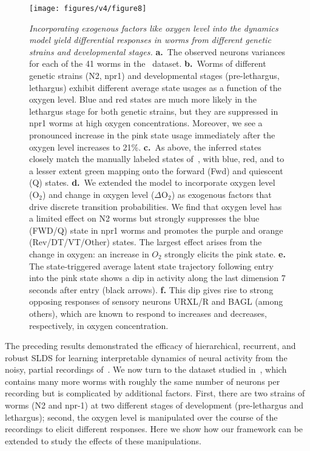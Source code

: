\documentclass[11pt]{article}
\begin{document}
\begin{figure}[t!]
\centering
\texttt{[image: figures/v4/figure8]} 
\caption{\textit{Incorporating exogenous factors like oxygen level
    into the dynamics model yield differential responses in worms from
    different genetic strains and developmental stages.}
  \textbf{a.}~The observed neurons variances for each of the 41 worms
  in the~\citet{nichols2017global} dataset.  \textbf{b.}~Worms of
  different genetic strains (N2, npr1) and developmental stages
  (pre-lethargus, lethargus) exhibit different average state usages as
  a function of the oxygen level.  Blue and red states are much more
  likely in the lethargus stage for both genetic strains, but they are
  suppressed in npr1 worms at high oxygen concentrations. Moreover, we
  see a pronounced increase in the pink state usage immediately after
  the oxygen level increases to 21\%.  \textbf{c.}~As above, the
  inferred states closely match the manually labeled states
  of~\citet{nichols2017global}, with blue, red, and to a lesser extent
  green mapping onto the forward (\textsf{Fwd}) and quiescent
  (\textsf{Q}) states.  \textbf{d.}~We extended the model to
  incorporate oxygen level (O$_2$) and change in oxygen level
  ($\Delta$O$_2$) as exogenous factors that drive discrete transition
  probabilities.  We find that oxygen level has a limited effect on N2
  worms but strongly suppresses the blue (\textsf{FWD/Q}) state in
  npr1 worms and promotes the purple and orange
  (\textsf{Rev/DT/VT/Other}) states. The largest effect arises from
  the change in oxygen: an increase in $O_2$ strongly elicits the pink
  state.  \textbf{e.} The state-triggered average latent state
  trajectory following entry into the pink state shows a dip in
  activity along the last dimension 7 seconds after entry (black
  arrows).  \textbf{f.} This dip gives rise to strong opposing
  responses of sensory neurons \textsf{URXL/R} and \textsf{BAGL}
  (among others), which are known to respond to increases and
  decreases, respectively, in oxygen concentration.  }
\label{fig:o2}
\end{figure}

The preceding results demonstrated the efficacy of hierarchical,
recurrent, and robust SLDS for learning interpretable dynamics of
neural activity from the noisy, partial recordings
of~\citet{kato2015global}.  We now turn to the dataset studied
in~\citet{nichols2017global}, which contains many more worms with
roughly the same number of neurons per recording but is complicated by
additional factors.  First, there are two strains of worms (N2 and
npr-1) at two different stages of development (pre-lethargus and
lethargus); second, the oxygen level is manipulated over the course of
the recordings to elicit different responses.  Here we show how our
framework can be extended to study the effects of these manipulations.
\end{document}
